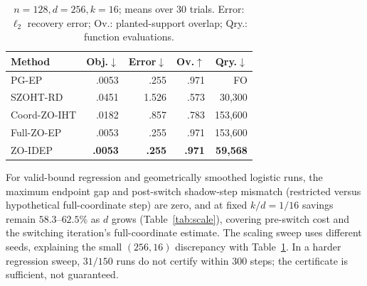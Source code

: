 \documentclass{article}
\begin{document}
\begin{table}[t]
\centering
\caption{$n=128,d=256,k=16$; means over 30 trials. Error: $\ell_2$ recovery error; Ov.: planted-support overlap; Qry.: function evaluations.}
\label{tab:main}
\setlength{\tabcolsep}{2pt}%
\begin{tabular}{@{}lrrrr@{}}
\toprule
Method & Obj.$\downarrow$ & Error$\downarrow$ & Ov.$\uparrow$ & Qry.$\downarrow$\\
\midrule
PG-EP \cite{zhao2026exact} & .0053 & .255 & .971 & FO\\
SZOHT-RD \cite{devazelhes2022zeroth} & .0451 & 1.526 & .573 & 30,300\\
Coord-ZO-IHT & .0182 & .857 & .783 & 153,600\\
Full-ZO-EP & .0053 & .255 & .971 & 153,600\\
ZO-IDEP & \textbf{.0053} & \textbf{.255} & \textbf{.971} & \textbf{59,568}\\
\bottomrule
\end{tabular}
\end{table}

For valid-bound regression and geometrically smoothed logistic runs, the maximum endpoint gap and post-switch shadow-step mismatch (restricted versus hypothetical full-coordinate step) are zero, and at fixed $k/d=1/16$ savings remain $58.3$--$62.5\%$ as $d$ grows (Table~\ref{tab:scale}), covering pre-switch cost and the switching iteration's full-coordinate estimate. The scaling sweep uses different seeds, explaining the small $(256,16)$ discrepancy with Table~\ref{tab:main}. In a harder regression sweep, $31/150$ runs do not certify within $300$ steps; the certificate is sufficient, not guaranteed.
\end{document}
